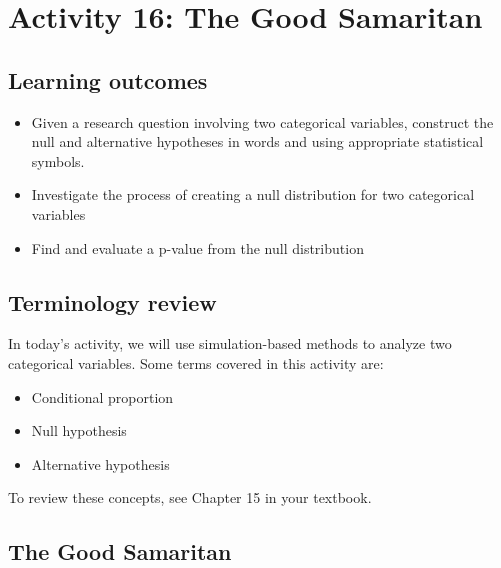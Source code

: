 \documentclass[
]{report}
\begin{document}
\newpage

\section{Activity 16: The Good Samaritan}\label{activity-16-the-good-samaritan}


\subsection{Learning outcomes}\label{learning-outcomes-17}

\begin{itemize}
\item
  Given a research question involving two categorical variables, construct the null and alternative hypotheses
  in words and using appropriate statistical symbols.
\item
  Investigate the process of creating a null distribution for two categorical variables
\item
  Find and evaluate a p-value from the null distribution
\end{itemize}

\subsection{Terminology review}\label{terminology-review-14}

In today's activity, we will use simulation-based methods to analyze two categorical variables. Some terms covered in this activity are:

\begin{itemize}
\item
  Conditional proportion
\item
  Null hypothesis
\item
  Alternative hypothesis
\end{itemize}

To review these concepts, see Chapter 15 in your textbook.

\subsection{The Good Samaritan}\label{the-good-samaritan}
\end{document}
